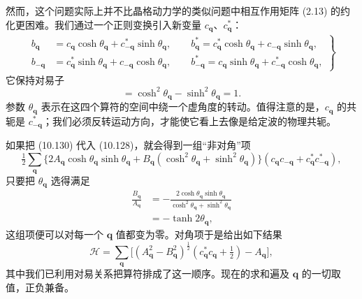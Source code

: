 然而，这个问题实际上并不比晶格动力学的类似问题中相互作用矩阵 (2.13) 的约化更困难。我们通过一个正则变换引入新变量 $c_{\mathbf{q}}$、$c_{\mathbf{q}}^*$：
\begin{align*}
\left.
\begin{aligned}
b_{\mathbf{q}} &= c_{\mathbf{q}}\cosh\theta_{\mathbf{q}} + c_{-\mathbf{q}}^*\sinh\theta_{\mathbf{q}}, \qquad b_{\mathbf{q}}^* = c_{\mathbf{q}}^*\cosh\theta_{\mathbf{q}} + c_{-\mathbf{q}}\sinh\theta_{\mathbf{q}}, \\
b_{-\mathbf{q}} &= c_{\mathbf{q}}^*\sinh\theta_{\mathbf{q}} + c_{-\mathbf{q}}\cosh\theta_{\mathbf{q}}, \qquad b_{-\mathbf{q}}^* = c_{\mathbf{q}}\sinh\theta_{\mathbf{q}} + c_{-\mathbf{q}}^*\cosh\theta_{\mathbf{q}},
\end{aligned}
\right\} \tag{10.130}
\end{align*}
它保持对易子
\begin{equation*}
[c_{\mathbf{q}}, c_{\mathbf{q}}^*] = \cosh^2\theta_{\mathbf{q}} - \sinh^2\theta_{\mathbf{q}} = 1. \tag{10.131}
\end{equation*}
参数 $\theta_{\mathbf{q}}$ 表示在这四个算符的空间中绕一个虚角度的转动。值得注意的是，$c_{\mathbf{q}}$ 的共轭是 $c_{-\mathbf{q}}^*$；我们必须反转运动方向，才能使它看上去像是给定波的物理共轭。

如果把 (10.130) 代入 (10.128)，就会得到一组“非对角”项
\begin{equation*}
\tfrac{1}{2} \sum_{\mathbf{q}} \bigl\{ 2A_{\mathbf{q}}\cosh\theta_{\mathbf{q}}\sinh\theta_{\mathbf{q}} + B_{\mathbf{q}}(\cosh^2\theta_{\mathbf{q}} + \sinh^2\theta_{\mathbf{q}}) \bigr\} (c_{\mathbf{q}} c_{-\mathbf{q}} + c_{\mathbf{q}}^* c_{-\mathbf{q}}^*), \tag{10.132}
\end{equation*}
只要把 $\theta_{\mathbf{q}}$ 选得满足
\begin{align*}
\frac{B_{\mathbf{q}}}{A_{\mathbf{q}}} &= -\frac{2\cosh\theta_{\mathbf{q}}\sinh\theta_{\mathbf{q}}}{\cosh^2\theta_{\mathbf{q}} + \sinh^2\theta_{\mathbf{q}}} \\
&= -\tanh 2\theta_{\mathbf{q}}, \tag{10.133}
\end{align*}
这组项便可以对每一个 $\mathbf{q}$ 值都变为零。对角项于是给出如下结果
\begin{equation*}
\mathcal{H} = \sum_{\mathbf{q}} \bigl[ (A_{\mathbf{q}}^2 - B_{\mathbf{q}}^2)^{\frac{1}{2}} (c_{\mathbf{q}}^* c_{\mathbf{q}} + \tfrac{1}{2}) - A_{\mathbf{q}} \bigr], \tag{10.134}
\end{equation*}
其中我们已利用对易关系把算符排成了这一顺序。现在的求和遍及 $\mathbf{q}$ 的一切取值，正负兼备。

